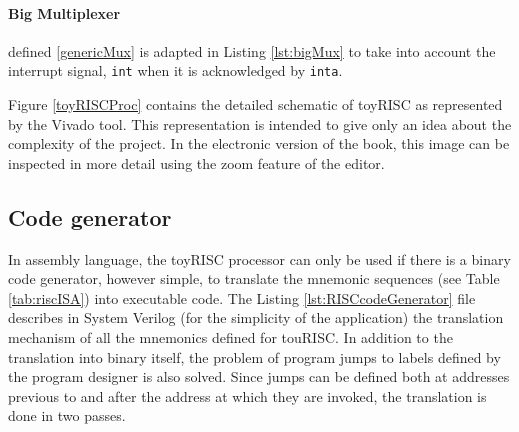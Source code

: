 
\paragraph{Big Multiplexer} defined \ref{genericMux} is adapted in Listing \ref{lst:bigMux} to take into account the interrupt signal, {\tt int} when it is acknowledged by {\tt inta}.



Figure \ref{toyRISCProc} contains the detailed schematic of toyRISC as represented by the Vivado tool. This representation is intended to give only an idea about the complexity of the project. In the electronic version of the book, this image can be inspected in more detail using the zoom feature of the editor.


\subsection{Code generator}\label{codeGen}

In assembly language, the toyRISC processor can only be used if there is a binary code generator, however simple, to translate the mnemonic sequences (see Table \ref{tab:riscISA}) into executable code. The Listing \ref{lst:RISCcodeGenerator} file describes in System Verilog (for the simplicity of the application) the translation mechanism of all the mnemonics defined for touRISC. In addition to the translation into binary itself, the problem of program jumps to labels defined by the program designer is also solved. Since jumps can be defined both at addresses previous to and after the address at which they are invoked, the translation is done in two passes.





